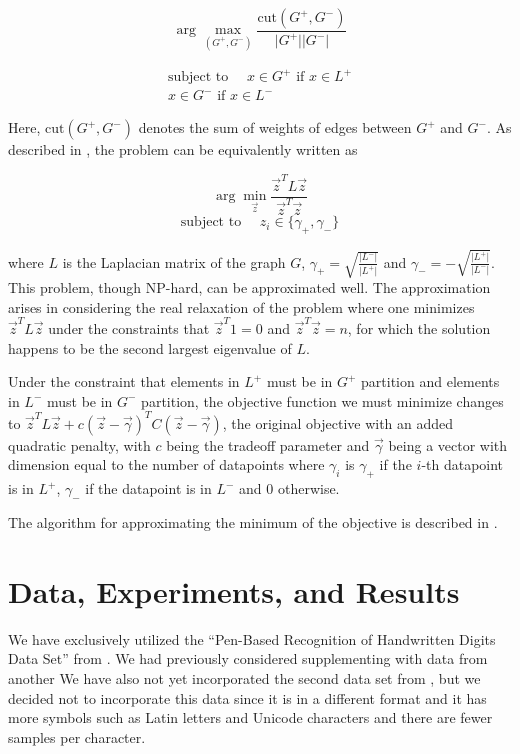 \documentclass[11pt]{article}
\begin{document}
\[\arg\max_{(G^+, G^-)}\frac{\mathrm{cut}(G^+,
G^-)}{\lvert G^+\rvert\lvert G^-\rvert}\]

\begin{align*}
\text{subject to }\quad x\in G^+\text{ if }x\in L^+\\
x\in G^-\text{ if }x\in L^-
\end{align*}

Here, $\mathrm{cut}(G^+, G^-)$ denotes the sum of weights of
edges between $G^+$ and $G^-$. As described in \cite{dhillon2001co}, the problem can be equivalently written as

\[\arg\min_{\vec{z}}\frac{\vec{z}^T L\vec{z}}{\vec{z}^T\vec{z}}\]
\[\text{subject to }\quad z_i\in\{\gamma_+,\gamma_-\}\]

where $L$ is the Laplacian matrix of the graph $G$,
$\gamma_+=\sqrt{\frac{\lvert L^-\rvert}{\lvert L^+\rvert}}$
and $\gamma_-=-\sqrt{\frac{\lvert L^+\rvert}{\lvert L^-\rvert}}$.
This problem, though NP-hard, can
be approximated well. The approximation arises in considering the real relaxation of the problem where one minimizes $\vec{z}^TL\vec{z}$
under the constraints that $\vec{z}^T1=0$ and $\vec{z}^T\vec{z}=n$,
for which the solution happens to be the second largest eigenvalue of
$L$.

Under the constraint that elements in $L^+$ must be in $G^+$
partition and elements in $L^-$ must be in $G^-$ partition,
the objective function we must minimize changes to
$\vec{z}^TL\vec{z}+c(\vec{z}-\vec{\gamma})^TC(\vec{z}-\vec{\gamma})$,
the original objective with an added quadratic penalty, with $c$
being the tradeoff parameter and $\vec{\gamma}$ being a vector
with dimension equal to the number of datapoints where $\gamma_i$
is $\gamma_+$ if the $i$-th datapoint is in $L^+$, $\gamma_-$
if the datapoint is in $L^-$ and 0 otherwise.

The algorithm for approximating the minimum of the objective is described
in \cite{joachims2003transductive}.


\section{Data, Experiments, and Results}

We have exclusively utilized the ``Pen-Based Recognition of Handwritten Digits Data Set'' from \cite{Alpaydin:1998}. We had previously considered supplementing with data from another We have also not yet incorporated the second data set from \cite{Llorens:2008}, but we decided not to incorporate this data since it is in a different format and it has more symbols such as Latin letters and Unicode characters and there are fewer samples per character.
\end{document}
